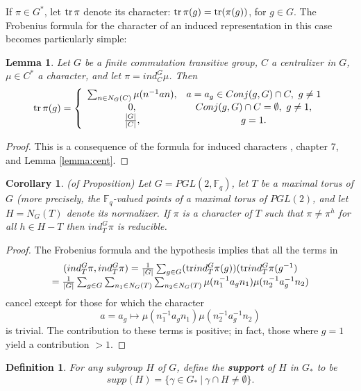 \documentclass[amsfonts,12pt]{article}
\newtheorem{corollary}[theorem]{Corollary}
\newtheorem{lemma}[theorem]{Lemma}
\newtheorem{definition}[theorem]{Definition}
\def\fff{\mathbb{F}}
\begin{document}
If $\pi\in G^*$, let ${\rm tr}\, \pi$ denote its character:
${\rm tr}\,\pi(g)={\rm tr}(\pi(g))$, for $g\in G$.
The Frobenius formula for the character of an induced representation
in this case becomes particularly simple:

\begin{lemma} Let $G$ be a finite commutation transitive group,
$C$ a centralizer in $G$, $\mu\in C^*$ a character,
and let $\pi=ind_C^G\mu$. Then 
\[
{\rm tr}\, \pi(g)=
\left\{
\begin{array}{cc}
\sum_{n\in N_G(C)}\mu(n^{-1}an), & a=a_g\in Conj(g,G)\cap C,\ g\not= 1\\
0, &Conj(g,G)\cap C =\emptyset,\ g\not= 1,\\
\frac{|G|}{|C|},& g=1.
\end{array}
\right.
\]
\end{lemma}

\begin{proof} This is a consequence of the formula
for induced characters \cite{Se}, chapter 7, and
Lemma \ref{lemma:cent}.
\end{proof}


\begin{corollary} (of Proposition)
Let $G=PGL(2,\fff_q)$, let $T$ be a maximal torus
of $G$ (more precisely, the $\fff_q$-valued points
of a maximal torus of $PGL(2)$, and let $H=N_G(T)$
denote its normalizer. If $\pi$ is a character of $T$ 
such that $\pi\not= \pi^h$ for all $h\in H-T$ then
$ind_T^G \pi$ is reducible.
\end{corollary}

\begin{proof}
The Frobenius formula and the hypothesis implies that
all the terms in 
\[
\begin{array}{c}
(ind_T^G \pi,ind_T^G \pi)=\frac{1}{|G|}\sum_{g\in G}
({\rm tr}ind_T^G \pi(g))({\rm tr}ind_T^G \pi(g^{-1})\\
=\frac{1}{|G|}\sum_{g\in G}\sum_{n_1\in N_G(T)}
\sum_{n_2\in N_G(T)}\mu(n_1^{-1}a_g n_1)\mu(n_2^{-1}a_g^{-1}n_2)
\end{array}
\]
cancel except for those for which the character
\[
a=a_g\longmapsto  \mu(n_1^{-1}a_g n_1)\mu(n_2^{-1}a_g^{-1}n_2)
\]
is trivial. The contribution to these terms is positive;
in fact, those where $g=1$ yield a contribution $>1$.
\end{proof}

\begin{definition}
For any subgroup $H$ of $G$, define the
{\bf support} of $H$ in $G_*$ to be
\[
supp(H)=\{\gamma\in G_*\ | \ \gamma\cap H\not= \emptyset\}.
\]
\end{definition}
\end{document}
